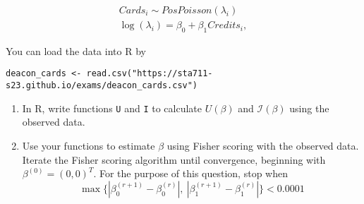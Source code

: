 \documentclass[11pt]{article}
\begin{document}
\begin{enumerate}
\begin{align*}
Cards_i \sim PosPoisson(\lambda_i) \\
\log(\lambda_i) = \beta_0 + \beta_1 Credits_i,
\end{align*}

You can load the data into R by

\begin{verbatim}
deacon_cards <- read.csv("https://sta711-s23.github.io/exams/deacon_cards.csv")
\end{verbatim} 

\begin{enumerate}
\item In R, write functions \verb;U; and \verb;I; to calculate $U(\beta)$ and $\mathcal{I}(\beta)$ using the observed data.

\item Use your functions to estimate $\beta$ using Fisher scoring with the observed data. Iterate the Fisher scoring algorithm until convergence, beginning with $\beta^{(0)} = (0, 0)^T$. For the purpose of this question, stop when 
$$\max \{ |\beta_0^{(r+1)} - \beta_0^{(r)}|, \ |\beta_1^{(r+1)} - \beta_1^{(r)}| \} < 0.0001$$
\end{enumerate}
\end{enumerate}
\end{document}

